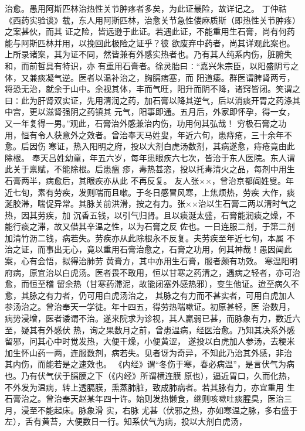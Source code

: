 \documentclass[a4paper,12pt,UTF8,twoside]{ctexbook}
\begin{document}
治愈。愚用阿斯匹林治热性关节肿疼者多矣，为此证最险，故详记之。 
丁仲祜《西药实验谈》载，东人用阿斯匹林，治愈关节急性偻麻质斯（即热性关节肿疼）之案甚伙，而其 
证之险，皆远逊于此证。若遇此证，不能重用生石膏，尚有何药能与阿斯匹林并用，以挽回此极险之证乎？彼 
欲废弃中药者，尚其详观此案也。 
上所录诸案，其为证不同，然皆兼有外感实热者也。乃有其人纯系内伤，脏腑失和，而前哲具有特识，亦 
有重用石膏者。徐灵胎曰∶“嘉兴朱宗臣，以阳盛阴亏之体，又兼痰凝气逆。医者以温补治之，胸膈痞塞，而 
阳道痿。群医谓脾肾两亏，将恐无治，就余于山中。余视其体，丰而气旺，阳升而阴不降，诸窍皆闭。笑谓之 
曰∶此为肝肾双实证，先用清润之药，加石膏以降其逆气，后以消痰开胃之药涤其中宫，更以滋肾强阴之药镇其 
元气，阳事即通。五月后，外家即怀孕，得一女，又一年复得一男。”观此，石膏治外感兼治内伤，功用何其弘哉！ 
穷极石膏之功用，恒有令人获意外之效者。曾治奉天马姓叟，年近六旬，患痔疮，三十余年不愈。后因伤 
寒证，热入阳明之府，投以大剂白虎汤数剂，其病遂愈，痔疮竟由此除根。 
奉天吕姓幼童，年五六岁，每年患眼疾六七次，皆治于东人医院。东人谓此关于禀赋，不能除根。后患瘟 
疹，毒热甚恣，投以托毒清火之品，每剂中用生石膏两半，病愈后，其眼疾亦从此 
不再反复。 
友人张××，曾治京都阎姓叟。年近七旬，素有劳疾，发则喘而且嗽。于冬日感冒风寒，上焦烦热，劳疾 
大作，痰涎胶滞，喘促异常。其脉关前洪滑，按之有力。张××治以生石膏二两以清时气之热，因其劳疾，加 
沉香五钱，以引气归肾。且以痰涎太盛，石膏能润痰之燥，不能行痰之滞，故又借其辛温之性，以为石膏之反 
佐也。一日连服二剂，于第二剂加清竹沥二钱，病若失。劳疾亦从此除根永不反复。夫劳疾至年近七旬，本属 
不治之证，而事出无心，竟以重用石膏治愈之，石膏之功用，何其神哉！愚因闻此案，心有会悟，拟得治肺劳 
黄膏方，其中亦用生石膏，服者颇有功效。 
寒温阳明府病，原宜治以白虎汤。医者畏不敢用，恒以甘寒之药清之，遇病之轻者，亦可治愈，而恒至稽 
留余热（甘寒药滞泥，故能闭塞外感热邪），变生他证。迨至病久不愈，其脉之有力者，仍可用白虎汤治之， 
其脉之有力而不甚实者，可用白虎加人参汤治之。曾治奉天一学徒。年十四五，得劳热喘嗽证。初原甚轻，医 
治数月，病势浸增，医者诿谓不治。遂来院求为诊视，其人羸弱已甚，而脉象有力，数近六至，疑其有外感伏 
热，询之果数月之前，曾患温病，经医治愈。乃知其决系外感留邪，问其心中时觉发热，大便干燥，小便黄涩， 
遂投以白虎加人参汤，去粳米加生怀山药一两，连服数剂，病若失。见者讶为奇异，不知此乃治其外感，非治 
其内伤，而能若是之速效也。 
《内经》谓“冬伤于寒，春必病温”，是言伏气为病也。乃有伏气伏于膈膜之下（《内经》所谓横连膜 
原也），逼近胃口，久而化热，不外发为温病，转上透膈膜，熏蒸肺脏，致成肺病者。若其脉有力，亦宜重用 
生石膏治之。曾治奉天赵某年四十许。始则发热懒食，继则咳嗽吐痰腥臭，医治三月，浸至不能起床。脉象滑 
实，右脉 
尤甚（伏邪之热，亦如寒温之脉，多右盛于左），舌有黄苔，大便数日一行。知系伏气为病，投以大剂白虎汤， 
\end{document}
